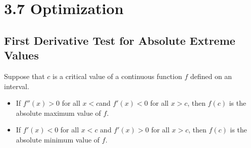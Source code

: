 %
%

\section*{3.7 Optimization}

\subsection*{First Derivative Test for Absolute Extreme Values}

Suppose that \(c\) is a critical value of a continuous function \(f\) defined on an interval.
\begin{itemize}
    \item If \(f''(x)>0\) for all \(x<c\)and \(f'(x)<0\) for all \(x>c\), then \(f(c)\) is the absolute maximum value of \(f\).
    \item If \(f'(x)<0\) for all \(x<c\) and \(f'(x)>0\) for all \(x>c\), then \(f(c)\) is the absolute minimum value of \(f\).
\end{itemize}

